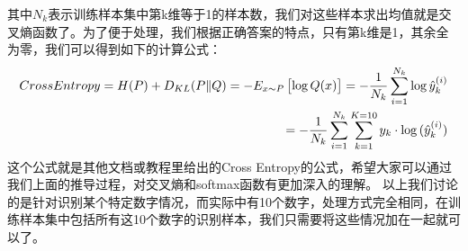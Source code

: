 \documentclass[UTF8]{article}
\begin{document}
其中$N_k$表示训练样本集中第k维等于1的样本数，我们对这些样本求出均值就是交叉熵函数了。为了便于处理，我们根据正确答案的特点，只有第k维是1，其余全为零，我们可以得到如下的计算公式：
\begin{equation}
\begin{aligned}
CrossEntropy=H(P) + D_{KL}(P \Vert Q)=-E_{\boldmath{x} \sim P}\begin{bmatrix}
\log{Q(x)}
\end{bmatrix}=-\frac{1}{N_k}\sum_{i=1}^{N_k}\log{\hat{y}^{(i)}_k}\\
=-\frac{1}{N_k}\sum_{i=1}^{N_k}\sum_{k=1}^{K=10}y_k \cdot \log{(\hat{y}^{(i)}_k)}
\end{aligned}
\label{lcrn-mnist-crossentropy-formula}
\end{equation}
这个公式就是其他文档或教程里给出的Cross Entropy的公式，希望大家可以通过我们上面的推导过程，对交叉熵和softmax函数有更加深入的理解。\newline
以上我们讨论的是针对识别某个特定数字情况，而实际中有10个数字，处理方式完全相同，在训练样本集中包括所有这10个数字的识别样本，我们只需要将这些情况加在一起就可以了。
\end{document}
